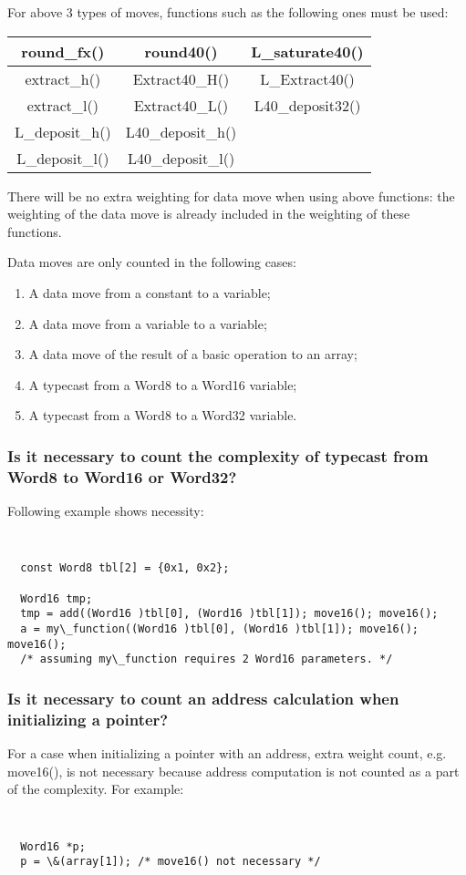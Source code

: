 For above 3 types of moves, functions such as the following ones
must be used:
\begin{center}
\begin{tabular}{|c|c|c|}
\hline
\hline round\_fx() & round40()   & L\_saturate40()\\
\hline extract\_h() & Extract40\_H()   & L\_Extract40()\\
\hline extract\_l() & Extract40\_L()   & L40\_deposit32()\\
\hline L\_deposit\_h()   & L40\_deposit\_h() & \\
\hline L\_deposit\_l()   & L40\_deposit\_l() & \\
\hline
\end{tabular}
\end{center}

There will be no extra weighting for data move when using above
functions: the weighting of the data move is already included in
the weighting of these functions.

Data moves are only counted in
the following cases:
\begin{enumerate}
\item A data move from a constant to a variable;
\item A data move from a variable to a variable;
\item A data move of the result of a basic operation to an array;
\item A typecast from a Word8 to a Word16 variable;
\item A typecast from a Word8 to a Word32 variable.
\end{enumerate}

\subsubsection{Is it necessary to count the complexity of typecast
  from Word8 to Word16 or Word32?}
Following example shows necessity:
{\tt\small
\begin{verbatim}
  const Word8 tbl[2] = {0x1, 0x2};

  Word16 tmp;
  tmp = add((Word16 )tbl[0], (Word16 )tbl[1]); move16(); move16();
  a = my\_function((Word16 )tbl[0], (Word16 )tbl[1]); move16(); move16();
  /* assuming my\_function requires 2 Word16 parameters. */
\end{verbatim}
}

\subsubsection{Is it necessary to count an address calculation when initializing a pointer?}
For a case when initializing a pointer with an address, extra weight
count, e.g. move16(), is not necessary because address computation is
not counted as a part of the complexity. For example:
{\tt\small
\begin{verbatim}
  Word16 *p;
  p = \&(array[1]); /* move16() not necessary */
\end{verbatim}
}%

